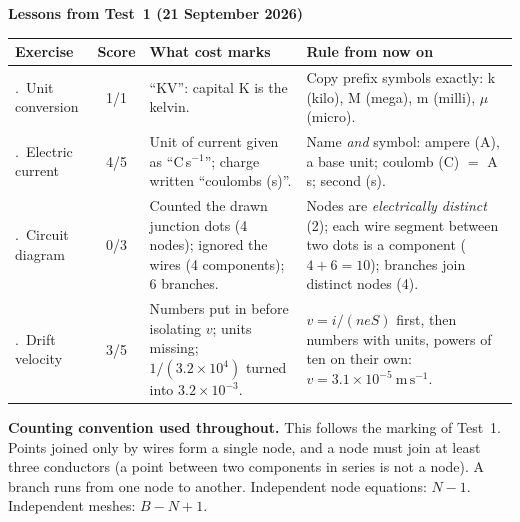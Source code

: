 \documentclass{ibetest}
\begin{document}
\vspace{7mm}
{\sffamily\bfseries\large Lessons from Test~1 (21 September 2026)}\par\vspace{3mm}
\begin{center}
\small
\begin{tabular}{@{}>{\raggedright\arraybackslash}p{27mm} c
                >{\raggedright\arraybackslash}p{50mm} >{\raggedright\arraybackslash}p{56mm}@{}}
\hline
\textbf{Exercise} & \textbf{Score} & \textbf{What cost marks} & \textbf{Rule from now on}\\
\hline
1.~Unit conversion & 1/1 &
  ``KV'': capital K is the kelvin. &
  Copy prefix symbols exactly: k (kilo), M (mega), m (milli), $\mu$ (micro).\\ \hline
2.~Electric current & 4/5 &
  Unit of current given as ``C\,s$^{-1}$''; charge written ``coulombs (s)''. &
  Name \emph{and} symbol: ampere (A), a base unit; coulomb (C) $=$ A\,s; second (s).\\
  \hline
3.~Circuit diagram & 0/3 &
  Counted the drawn junction dots (4 nodes); ignored the wires (4 components); 6 branches. &
  Nodes are \emph{electrically distinct} (2); each wire segment between two dots is a
  component ($4 + 6 = 10$); branches join distinct nodes (4).\\ \hline
4.~Drift velocity & 3/5 &
  Numbers put in before isolating $v$; units missing; $1/(3.2\times10^{4})$ turned into
  $3.2\times10^{-3}$. &
  $v = i/(neS)$ first, then numbers with units, powers of ten on their own:
  $v = 3.1\times10^{-5}\ \mathrm{m\,s^{-1}}$.\\ \hline
\end{tabular}
\end{center}

\vspace{6mm}
\begin{tcolorbox}[enhanced, colback=black!3, colframe=black!45, boxrule=0.4pt, arc=1mm,
  fontupper=\small]
\textbf{Counting convention used throughout.} This follows the marking of Test~1. Points joined
only by wires form a single node, and a node must join at least three conductors (a point
between two components in series is not a node). A branch runs from one node to another.
Independent node equations: $N - 1$. Independent meshes: $B - N + 1$.
\end{tcolorbox}
\end{document}
